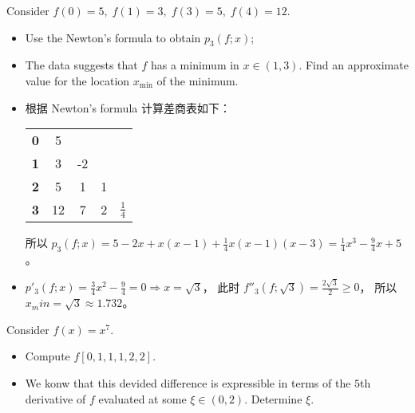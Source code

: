 \documentclass[lang=cn,a4paper,newtx,bibend=bibtex]{elegantpaper}
\begin{document}
\begin{prob}[2.9.1-\textrm{IV}.]
    Consider $f(0)=5,\; f(1)=3,\; f(3)=5,\; f(4)=12$.
  \begin{itemize}
    \item Use the Newton's formula to obtain $p_3(f;x)$;
    \item The data suggests that $f$ has a minimum in $x\in(1,3)$. Find an approximate value for the location $x_\text{min}$ of the minimum.
  \end{itemize}
\end{prob}

\begin{solution}
\begin{itemize}
\item 根据 Newton's formula 计算差商表如下：
\begin{tabular}{c|cccc}
   &  &  &  & \\
  \hline
  \textbf{0} & 5 & & & \\
  \textbf{1} & 3 & -2 & &  \\
  \textbf{2} & 5 & 1 & 1 & \\
  \textbf{3} & 12 & 7 & 2 & $\frac14$ \\
  \end{tabular}


所以  $p_3(f; x) = 5 - 2x + x(x - 1) + \frac14x(x-1)(x -3) = \frac14x^3 - \frac94x + 5$。

\item $p'_3(f; x) = \frac34x^2 - \frac94 = 0 \Rightarrow x = \sqrt{3}$， 此时 $f''_3(f; \sqrt{3}) = \frac{2\sqrt{3}}{2} \ge 0$，
所以 $x_min = \sqrt{3} \approx 1.732$。
\end{itemize}
\end{solution}

\begin{prob}[2.9.1-\textrm{V}.]
    Consider $f(x)=x^7$.
    \begin{itemize}
      \item Compute $f[0,1,1,1,2,2]$.
      \item We konw that this devided difference is expressible in terms of the $5$th derivative of $f$ evaluated at some $\xi\in(0,2)$. Determine $\xi$.
    \end{itemize}
\end{prob}
\end{document}

